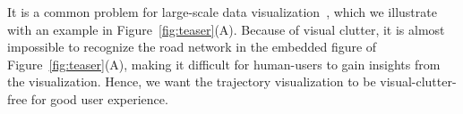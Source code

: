 




 It is a common problem for large-scale data visualization~\cite{clutter}, which we illustrate with an example in Figure~\ref{fig:teaser}(A). Because of visual clutter, it is almost impossible to recognize the road network in the embedded figure of Figure~\ref{fig:teaser}(A), making it difficult for human-users to gain insights from the visualization. Hence, we want the trajectory visualization to be visual-clutter-free for good user experience.

%



